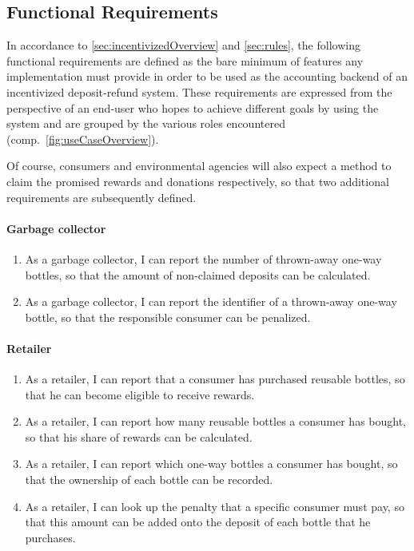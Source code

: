\def\twodigits#1{%
  \ifnum#1<10 0\fi
  \number#1}

\subsection{Functional Requirements}
\label{sec:FRs}
In accordance to \autoref{sec:incentivizedOverview} and \autoref{sec:rules}, the following functional requirements are defined as the bare minimum of features any implementation must provide in order to be used as the accounting backend of an incentivized deposit-refund system. These requirements are expressed from the perspective of an end-user who hopes to achieve different goals by using the system and are grouped by the various roles encountered (comp.~\autoref{fig:useCaseOverview}).

Of course, consumers and environmental agencies will also expect a method to claim the promised rewards and donations respectively, so that two additional requirements are subsequently defined.

\paragraph{Garbage collector}
\begin{enumerate}[font=\sffamily,label={\textbf{FR-\protect\twodigits{\theenumi}}},leftmargin=1.4cm, ref=FR-\protect\twodigits{\theenumi}]
	\item As a garbage collector, I can report the number of thrown-away one-way bottles, so that the amount of non-claimed deposits can be calculated. \label{itm:reportNumber}
	\item As a garbage collector, I can report the identifier of a thrown-away one-way bottle, so that the responsible consumer can be penalized. \label{itm:reportIdentifier}
\end{enumerate}

\paragraph{Retailer}
\begin{enumerate}[resume, font=\sffamily, label={\textbf{FR-\protect\twodigits{\theenumi}}},leftmargin=1.4cm, ref=FR-\protect\twodigits{\theenumi}]
	\item As a retailer, I can report that a consumer has purchased reusable bottles, so that he can become eligible to receive rewards. \label{itm:reportReusablePurchase}
	\item As a retailer, I can report how many reusable bottles a consumer has bought, so that his share of rewards can be calculated. \label{itm:reportReusableNumber}
	\item As a retailer, I can report which one-way bottles a consumer has bought, so that the ownership of each bottle can be recorded. \label{itm:reportOneWays}
	\item As a retailer, I can look up the penalty that a specific consumer must pay, so that this amount can be added onto the deposit of each bottle that he purchases. \label{itm:lookUpPenalty}
\end{enumerate}

